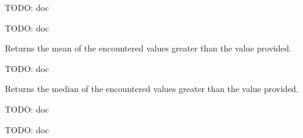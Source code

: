 \documentclass[letterpaper,10pt,english]{sphinxmanual}
\begin{document}

\begin{fulllineitems}
\label{code:gfunc.analysis_classes.Metric}
TODO: doc

\begin{fulllineitems}
\label{code:gfunc.analysis_classes.Metric.__init__}
TODO: doc

\end{fulllineitems}


\begin{fulllineitems}
\label{code:gfunc.analysis_classes.Metric.mean}
Returns the mean of the encountered values greater than the value provided.

\end{fulllineitems}


\begin{fulllineitems}
\label{code:gfunc.analysis_classes.Metric.measure_relation}
TODO: doc

\end{fulllineitems}


\begin{fulllineitems}
\label{code:gfunc.analysis_classes.Metric.median}
Returns the median of the encountered values greater than the value provided.

\end{fulllineitems}


\end{fulllineitems}


\begin{fulllineitems}
\label{code:gfunc.analysis_classes.PhyloExpnCorrelationIndex}
TODO: doc

\begin{fulllineitems}
\label{code:gfunc.analysis_classes.PhyloExpnCorrelationIndex.__init__}
TODO: doc

\end{fulllineitems}


\end{fulllineitems}
\end{document}
